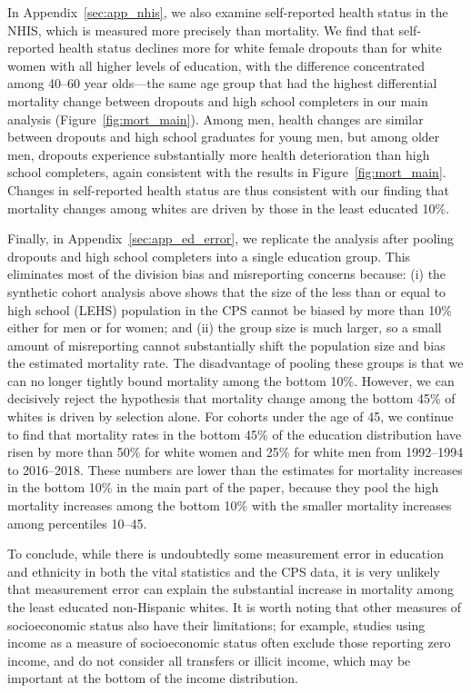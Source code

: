 \documentclass[12pt,letterpaper]{article}
\numberwithin{equation}{section}
\begin{document}
In Appendix~\ref{sec:app_nhis}, we also examine self-reported health status in the NHIS, which is measured more precisely than mortality. We find that self-reported health status declines more for white female dropouts than for white women with all higher levels of education, with the difference concentrated among 40--60 year olds---the same age group that had the highest differential mortality change between dropouts and high school completers in our main analysis (Figure~\ref{fig:mort_main}). Among men, health changes are similar between dropouts and high school graduates for young men, but among older men, dropouts experience substantially more health deterioration than high school completers, again consistent with the results in Figure~\ref{fig:mort_main}. Changes in self-reported health status are thus consistent with our finding that mortality changes among whites are driven by those in the least educated 10\%.

Finally, in Appendix~\ref{sec:app_ed_error}, we replicate the analysis after pooling dropouts and high school completers into a single education group. This eliminates most of the division bias and misreporting concerns because: (i) the synthetic cohort analysis above shows that the size of the less than or equal to high school (LEHS) population in the CPS cannot be biased by more than 10\% either for men or for women; and (ii) the group size is much larger, so a small amount of misreporting cannot substantially shift the population size and bias the estimated mortality rate. The disadvantage of pooling these groups is that we can no longer tightly bound mortality among the bottom 10\%. However, we can decisively reject the hypothesis that mortality change among the bottom 45\% of whites is driven by selection alone. For cohorts under the age of 45, we continue to find that mortality rates in the bottom 45\% of the education distribution have risen by more than 50\% for white women and 25\% for white men from 1992--1994 to 2016--2018. These numbers are lower than the estimates for mortality increases in the bottom 10\% in the main part of the paper, because they pool the high mortality increases among the bottom 10\% with the smaller mortality increases among percentiles 10--45.

To conclude, while there is undoubtedly some measurement error in
education and ethnicity in both the vital statistics and the CPS data,
it is very unlikely that measurement error can explain the substantial
increase in mortality among the least educated non-Hispanic whites.
It is worth noting that other measures of socioeconomic status also
have their limitations; for example, studies using income as a measure
of socioeconomic status often exclude those reporting zero income, and
do not consider all transfers or illicit income, which may be important at the bottom of the income distribution.
\end{document}
